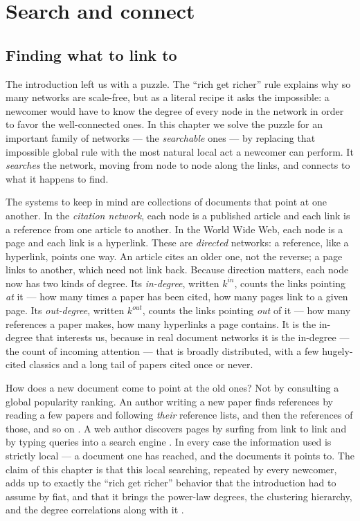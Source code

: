 \chapter{Search and connect}
\label{ch:search}

\section{Finding what to link to}

The introduction left us with a puzzle. The ``rich get richer'' rule explains
why so many networks are scale-free, but as a literal recipe it asks the
impossible: a newcomer would have to know the degree of every node in the
network in order to favor the well-connected ones. In this chapter we solve the
puzzle for an important family of networks --- the \emph{searchable} ones --- by
replacing that impossible global rule with the most natural local act a newcomer
can perform. It \emph{searches} the network, moving from node to node along the
links, and connects to what it happens to find.

The systems to keep in mind are collections of documents that point at one
another. In the \emph{citation network}, each node is a published article and
each link is a reference from one article to another. In the World Wide Web,
each node is a page and each link is a hyperlink. These are \emph{directed}
networks: a reference, like a hyperlink, points one way. An article cites an
older one, not the reverse; a page links to another, which need not link back.
Because direction matters, each node now has two kinds of degree. Its
\emph{in-degree}, written $k^{in}$, counts the links pointing \emph{at} it ---
how many times a paper has been cited, how many pages link to a given page. Its
\emph{out-degree}, written $k^{out}$, counts the links pointing \emph{out} of it
--- how many references a paper makes, how many hyperlinks a page contains. It is
the in-degree that interests us, because in real document networks it is the
in-degree --- the count of incoming attention --- that is broadly distributed,
with a few hugely-cited classics and a long tail of papers cited once or never.

How does a new document come to point at the old ones? Not by consulting a
global popularity ranking. An author writing a new paper finds references by
reading a few papers and following \emph{their} reference lists, and then the
references of those, and so on \citep{price1965}. A web author discovers pages by
surfing from link to link and by typing queries into a search engine
\citep{brin1998}. In every case the information used is strictly local --- a
document one has reached, and the documents it points to. The claim of this
chapter is that this local searching, repeated by every newcomer, adds up to
exactly the ``rich get richer'' behavior that the introduction had to assume by
fiat, and that it brings the power-law degrees, the clustering hierarchy, and
the degree correlations along with it \citep{vazquez2001,vazquez2003}.

